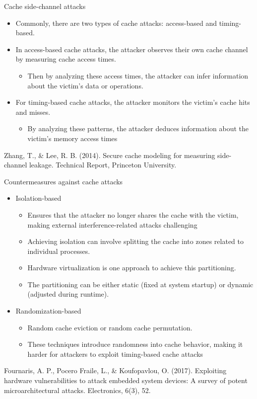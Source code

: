 \begin{frame}{Cache side-channel attacks}
    \begin{itemize}
        \item Commonly, there are two types of cache attacks: access-based and timing-based.
        \item In access-based cache attacks, the attacker observes their own cache channel by measuring cache access times.
        \begin{itemize}
            \item Then by analyzing these access times, the attacker can infer information about the victim’s data or operations.
        \end{itemize}
        \item For timing-based cache attacks, the attacker monitors the victim’s cache hits and misses.
        \begin{itemize}
            \item By analyzing these patterns, the attacker deduces information about the victim’s memory access times
        \end{itemize}
    \end{itemize}
\vfill
{\small Zhang, T., \& Lee, R. B. (2014). Secure cache modeling for measuring side-channel leakage. Technical Report, Princeton University.}
\end{frame}

\begin{frame}{Countermeasures against cache attacks}
    \begin{itemize}
    \item Isolation-based
    \begin{itemize}
        \item Ensures that the attacker no longer shares the cache with the victim, making external interference-related attacks challenging
        \item Achieving isolation can involve splitting the cache into zones related to individual processes.
        \item Hardware virtualization is one approach to achieve this partitioning.
        \item The partitioning can be either static (fixed at system startup) or dynamic (adjusted during runtime).
    \end{itemize}
    \item Randomization-based
    \begin{itemize}
        \item Random cache eviction or random cache permutation.
        \item These techniques introduce randomness into cache behavior, making it harder for attackers to exploit timing-based cache attacks
    \end{itemize}
    \end{itemize}
    \vfill
    {\small Fournaris, A. P., Pocero Fraile, L., \& Koufopavlou, O. (2017). Exploiting hardware vulnerabilities to attack embedded system devices: A survey of potent microarchitectural attacks. Electronics, 6(3), 52.}
\end{frame}

